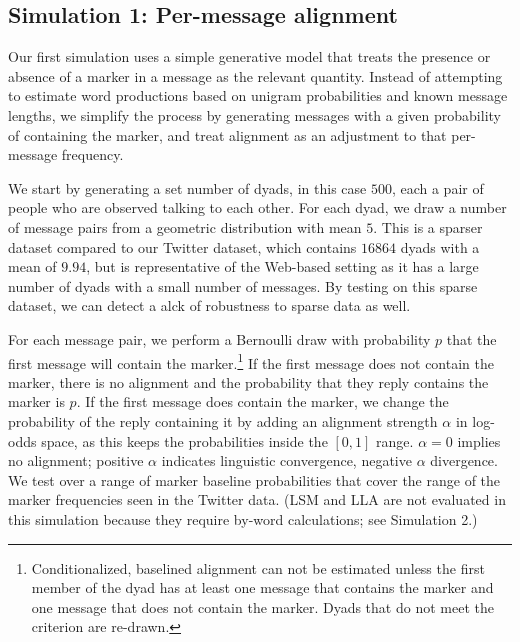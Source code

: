 \documentclass{acm_proc_article-sp}
\begin{document}
\subsection{Simulation 1: Per-message alignment}
Our first simulation uses a simple generative model that treats the presence or absence of a marker in a message as the relevant quantity. Instead of attempting to estimate word productions based on unigram probabilities and known message lengths, we simplify the process by generating messages with a given probability of containing the marker, and treat alignment as an adjustment to that per-message frequency.

We start by generating a set number of dyads, in this case $500$, each a pair of people who are observed talking to each other. For each dyad, we draw a number of message pairs from a geometric distribution with mean $5$.  This is a sparser dataset compared to our Twitter dataset, which contains $16864$ dyads with a mean of $9.94$, but is representative of the Web-based setting as it has a large number of dyads with a small number of messages. By testing on this sparse dataset, we can detect a alck of robustness to sparse data as well.

For each message pair, we perform a Bernoulli draw with probability $p$ that the first message will contain the marker.\footnote{Conditionalized, baselined alignment can not be estimated unless the first member of the dyad has at least one message that contains the marker and one message that does not contain the marker. Dyads that do not meet the criterion are re-drawn.}  If the first message does not contain the marker, there is no alignment and the probability that they reply contains the marker is $p$. If the first message does contain the marker, we change the probability of the reply containing it by adding an alignment strength $\alpha$ in log-odds space, as this keeps the probabilities inside the $[0,1]$ range. $\alpha = 0$ implies no alignment; positive $\alpha$ indicates linguistic convergence, negative $\alpha$ divergence.  We test over a range of marker baseline probabilities that cover the range of the marker frequencies seen in the Twitter data.   (LSM and LLA are not evaluated in this simulation because they require by-word calculations; see Simulation 2.)
\end{document}
